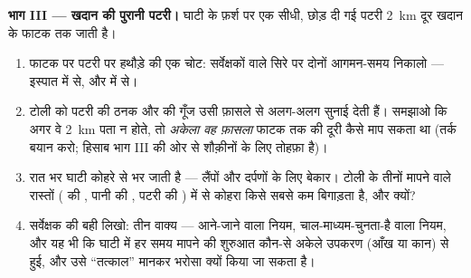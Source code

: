 \begin{problem}
\medskip\noindent\textbf{भाग III --- खदान की पुरानी पटरी।}
घाटी के फ़र्श पर एक सीधी, छोड़ दी गई पटरी \qty{2}{km} दूर खदान के
फाटक तक जाती है।
\begin{enumerate}[resume]
  \item फाटक पर पटरी पर हथौड़े की एक चोट: सर्वेक्षकों वाले सिरे पर
        दोनों आगमन-समय निकालो --- इस्पात में से, और  में से।
  \item टोली को पटरी की ठनक और  की गूँज उसी फ़ासले से अलग-अलग
        सुनाई देती हैं। समझाओ कि अगर वे \qty{2}{km} पता न होते, तो
        \emph{अकेला वह फ़ासला} फाटक तक की दूरी कैसे माप सकता था
        (तर्क बयान करो; हिसाब भाग III की ओर से शौक़ीनों के लिए
        तोहफ़ा है)।
  \item रात भर घाटी कोहरे से भर जाती है --- लैंपों और दर्पणों के लिए
        बेकार। टोली के तीनों मापने वाले रास्तों ( की , पानी
        की , पटरी की ) में से कोहरा किसे सबसे कम बिगाड़ता
        है, और क्यों?
  \item सर्वेक्षक की बही लिखो: तीन वाक्य --- आने-जाने वाला नियम,
        चाल-माध्यम-चुनता-है वाला नियम, और यह भी कि घाटी में हर समय
        मापने की शुरुआत कौन-से अकेले उपकरण (आँख या कान) से हुई, और
        उसे ``तत्काल'' मानकर भरोसा क्यों किया जा सकता है।
\end{enumerate}
\end{problem}

